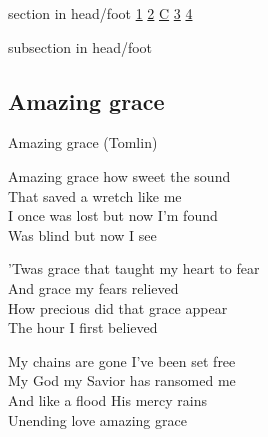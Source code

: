 \documentclass{beamer}
\begin{document}
{
{ 
 {
 \begin{beamercolorbox}[ht=4.5ex,dp=1.5ex,%
      leftskip=.3cm,rightskip=.3cm plus1fil]{section in head/foot}
 \fontsize{12}{25}\selectfont 
\hyperlink{Amazing grace['My chains are gone'](Tomlin)1}{1}
\hyperlink{Amazing grace['My chains are gone'](Tomlin)2}{2}
\hyperlink{Amazing grace['My chains are gone'](Tomlin)C}{C}
\hyperlink{Amazing grace['My chains are gone'](Tomlin)3}{3}
\hyperlink{Amazing grace['My chains are gone'](Tomlin)4}{4}
 
 \end{beamercolorbox}%
  \begin{beamercolorbox}[ht=2.5ex,dp=1.125ex,%
   leftskip=.3cm,rightskip=.3cm plus1fil]{subsection in head/foot}
   \insertauthor
 \end{beamercolorbox}%
 }
}
\subsection{ Amazing grace }

\hypertarget{Amazing grace['My chains are gone'](Tomlin)1}{}
\begin{frame}{Amazing grace (Tomlin)}
\fontsize{ 18 }{ 23 }\selectfont

Amazing grace how sweet the sound\\ 
That saved a wretch like me\\ 
I once was lost but now I'm found\\ 
Was blind but now I see 

\end{frame}

\hypertarget{Amazing grace['My chains are gone'](Tomlin)2}{}
\begin{frame}{}
\fontsize{ 18 }{ 23 }\selectfont

'Twas grace that taught my heart to fear\\ 
And grace my fears relieved\\ 
How precious did that grace appear\\ 
The hour I first believed 

\end{frame}

\hypertarget{Amazing grace['My chains are gone'](Tomlin)C}{}
\begin{frame}{}
\fontsize{ 18 }{ 23 }\selectfont

My chains are gone I've been set free\\ 
My God my Savior has ransomed me\\ 
And like a flood His mercy rains\\ 
Unending love amazing grace 


\end{frame}}
\end{document}
